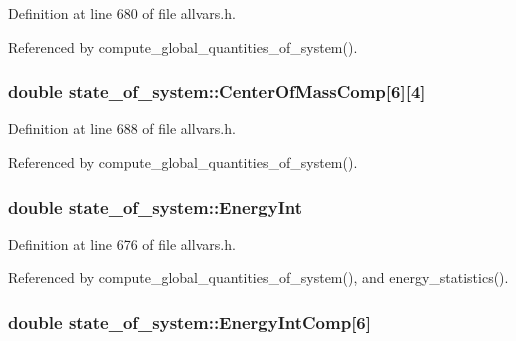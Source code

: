 Definition at line 680 of file allvars.h.



Referenced by compute\_\-global\_\-quantities\_\-of\_\-system().

\hypertarget{structstate__of__system_a828dd437a8be308919aa25633135a902}{
\subsubsection[{CenterOfMassComp}]{\setlength{\rightskip}{0pt plus 5cm}double {\bf state\_\-of\_\-system::CenterOfMassComp}\mbox{[}6\mbox{]}\mbox{[}4\mbox{]}}}
\label{structstate__of__system_a828dd437a8be308919aa25633135a902}


Definition at line 688 of file allvars.h.



Referenced by compute\_\-global\_\-quantities\_\-of\_\-system().

\hypertarget{structstate__of__system_a8ee567f49007a65817989a252d8c4f90}{
\subsubsection[{EnergyInt}]{\setlength{\rightskip}{0pt plus 5cm}double {\bf state\_\-of\_\-system::EnergyInt}}}
\label{structstate__of__system_a8ee567f49007a65817989a252d8c4f90}


Definition at line 676 of file allvars.h.



Referenced by compute\_\-global\_\-quantities\_\-of\_\-system(), and energy\_\-statistics().

\hypertarget{structstate__of__system_af96bea4b9655900eef6d7734629241a7}{
\subsubsection[{EnergyIntComp}]{\setlength{\rightskip}{0pt plus 5cm}double {\bf state\_\-of\_\-system::EnergyIntComp}\mbox{[}6\mbox{]}}}
\label{structstate__of__system_af96bea4b9655900eef6d7734629241a7}


